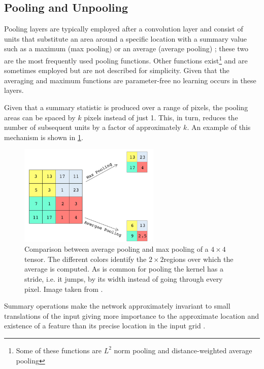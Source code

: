 \subsection{Pooling and Unpooling}
Pooling layers are typically employed after a convolution layer and consist of units that substitute an area around a specific location with a summary value such as a maximum (max pooling) or an average (average pooling) \citet{Lecun2015DeepLearning}; these two are the most frequently used pooling functions. Other functions exist\footnote{Some of these functions are $L^2$ norm pooling and distance-weighted average pooling} and are sometimes employed but are not described for simplicity. Given that the averaging and maximum functions are parameter-free no learning occurs in these layers.

Given that a summary statistic is produced over a range of pixels, the pooling areas can be spaced by $k$ pixels instead of just 1. This, in turn, reduces the number of subsequent units by a factor of approximately $k$. An example of this mechanism is shown in \cref{fig:MaxAndAvgPooling}.

\begin{figure}[!h]
    \centering
    \includegraphics[width=0.6\textwidth]{MaxAndAvgPooling.png}
    \caption{Comparison between average pooling and max pooling of a $4 \times 4$ tensor. The different colors identify the $2\times2$regions over which the average is computed. As is common for pooling the kernel has a stride, i.e. it jumps, by its width instead of going through every pixel. Image taken from \citet{Aljaafari2018IchthyoplanktonLearning}.}
    \label{fig:MaxAndAvgPooling}
\end{figure}

Summary operations make the network approximately invariant to small translations of the input giving more importance to the approximate location and existence of a feature than its precise location in the input grid  \citep{Goodfellow2016}. 

